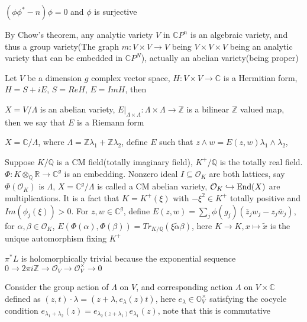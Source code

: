 $(\phi\phi^*-n)\phi=0$ and $\phi$ is surjective

By Chow's theorem, any analytic variety $V$ in $\mathbb CP^n$ is an algebraic variety, and thus a group variety(The graph $m:V\times V\to V$ being $V\times V\times V$ being an analytic variety that can be embedded in $\mathbb CP^N$), actually an abelian variety(being proper)

Let $V$ be a dimension $g$ complex vector space, $H:V\times V\to\mathbb C$ is a Hermitian form, $H=S+iE$, $S=Re H$, $E=Im H$, then

$X=V/\Lambda$ is an abelian variety, $E|_{\Lambda\times\Lambda}:\Lambda\times\Lambda\to\mathbb Z$ is a bilinear $\mathbb Z$ valued map, then we say that $E$ is a Riemann form

\begin{example}
$X=\mathbb C/\Lambda$, where $\Lambda=\mathbb Z\lambda_1+\mathbb Z\lambda_2$, define $E$ such that $z\wedge w=E(z,w)\lambda_1\wedge\lambda_2$, 
\end{example}

\begin{example}
Suppose $K/\mathbb Q$ is a CM field(totally imaginary field), $K^+/\mathbb Q$ is the totally real field. $\Phi:K\otimes_{\mathbb Q}\mathbb R\to\mathbb C^g$ is an embedding. Nonzero ideal $I\subseteq \mathcal O_K$ are both lattices, say $\Phi(\mathcal O_K)$ is $\Lambda$, $X=\mathbb C^g/\Lambda$ is called a CM abelian variety, $\mathcal O_K\hookrightarrow\operatorname{End}(X)$ are multiplications. It is a fact that $K=K^+(\xi)$ with $-\xi^2\in K^+$ totally positive and $Im(\phi_j(\xi))>0$. For $z,w\in\mathbb C^g$, define $E(z,w)=\sum_j\phi(g_j)(\bar z_jw_j-z_j\bar w_j)$, for $\alpha,\beta\in\mathcal O_K$, $E(\Phi(\alpha),\Phi(\beta))=Tr_{K/\mathbb Q}(\xi\tilde\alpha\beta)$, here $K\to K, x\mapsto\tilde x$ is the unique automorphism fixing $K^+$
\end{example}

\begin{center}
\end{center}

$\pi^*L$ is holomorphically trivial because the exponential sequence $0\to 2\pi i\mathbb Z\to\mathcal O_V\to\mathcal O_V^\times\to0$

Consider the group action of $\Lambda$ on $V$, and corresponding action $\Lambda$ on $V\times\mathbb C$ defined as $(z,t)\cdot\lambda=(z+\lambda,e_\lambda(z)t)$, here $e_\lambda\in\mathbb O_V^\times$ satisfying the cocycle condition $e_{\lambda_1+\lambda_2}(z)=e_{\lambda_2(z+\lambda_1)}e_{\lambda_1}(z)$, note that this is commutative


